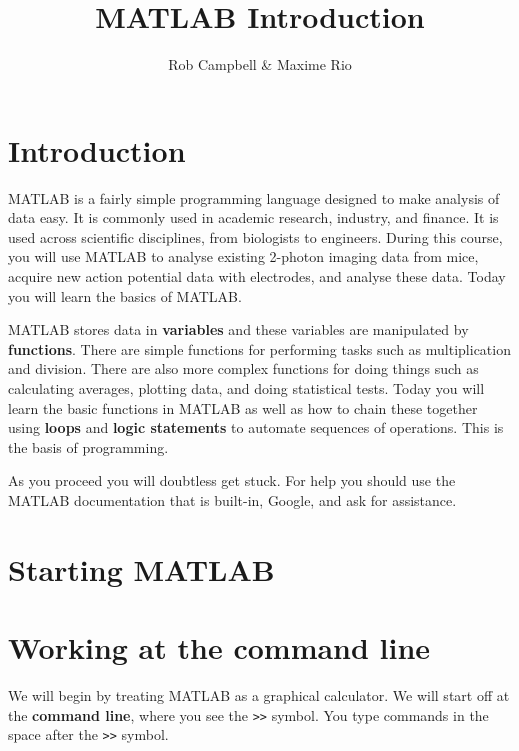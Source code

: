 \documentclass{article}
\title{MATLAB Introduction}
\author{Rob Campbell \& Maxime Rio}
\date{}
\begin{document}
\maketitle


\section*{Introduction}

MATLAB is a fairly simple programming language designed to make analysis of data easy.
It is commonly used in academic research, industry, and finance.
It is used across scientific disciplines, from biologists to engineers.
During this course, you will use MATLAB to analyse existing 2-photon imaging data from mice, 
acquire new action potential data with electrodes, and analyse these data.
Today you will learn the basics of MATLAB.

MATLAB stores data in \textbf{variables} and these variables are manipulated by \textbf{functions}.
There are simple functions for performing tasks such as multiplication and division.
There are also more complex functions for doing things such as calculating averages, 
plotting data, and doing statistical tests. Today you will learn the basic functions in 
MATLAB as well as how to chain these together using \textbf{loops} and \textbf{logic statements} 
to automate sequences of operations. This is the basis of programming.

As you proceed you will doubtless get stuck. For help you should use the MATLAB 
documentation that is built-in, Google, and ask for assistance.


\section{Starting MATLAB}



\section{Working at the command line}

We will begin by treating MATLAB as a graphical calculator.
We will start off at the \textbf{command line}, where you see the \verb|>>| symbol.
You type commands in the space after the \verb|>>| symbol.
\end{document}
